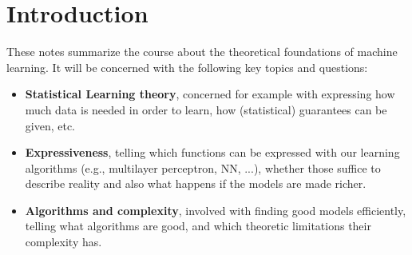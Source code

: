 \section*{Introduction}
\setcounter{figure}{0}

These notes summarize the course about the theoretical foundations of machine learning. It will be concerned with the following key topics and questions:
\begin{itemize}
  \item \textbf{Statistical Learning theory}, concerned for example with expressing how much data is needed in order to learn, how (statistical) guarantees can be given, etc.
  \item \textbf{Expressiveness}, telling which functions can be expressed with our learning algorithms (e.g., multilayer perceptron, NN, ...), whether those suffice to describe reality and also what happens if the models are made richer.
  \item \textbf{Algorithms and complexity}, involved with finding good models efficiently, telling what algorithms are good, and which theoretic limitations their complexity has.
\end{itemize}

